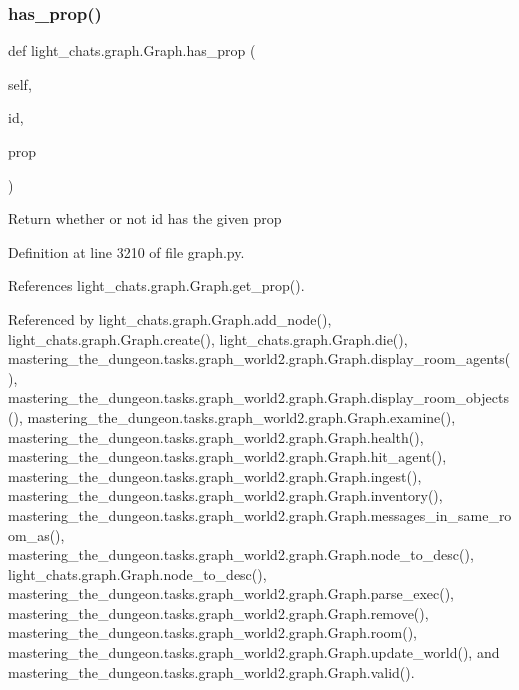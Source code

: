 \subsubsection{\texorpdfstring{has\+\_\+prop()}{has\_prop()}}
{\footnotesize\ttfamily def light\+\_\+chats.\+graph.\+Graph.\+has\+\_\+prop (\begin{DoxyParamCaption}\item[{}]{self,  }\item[{}]{id,  }\item[{}]{prop }\end{DoxyParamCaption})}

\begin{DoxyVerb}Return whether or not id has the given prop\end{DoxyVerb}
 

Definition at line 3210 of file graph.\+py.



References light\+\_\+chats.\+graph.\+Graph.\+get\+\_\+prop().



Referenced by light\+\_\+chats.\+graph.\+Graph.\+add\+\_\+node(), light\+\_\+chats.\+graph.\+Graph.\+create(), light\+\_\+chats.\+graph.\+Graph.\+die(), mastering\+\_\+the\+\_\+dungeon.\+tasks.\+graph\+\_\+world2.\+graph.\+Graph.\+display\+\_\+room\+\_\+agents(), mastering\+\_\+the\+\_\+dungeon.\+tasks.\+graph\+\_\+world2.\+graph.\+Graph.\+display\+\_\+room\+\_\+objects(), mastering\+\_\+the\+\_\+dungeon.\+tasks.\+graph\+\_\+world2.\+graph.\+Graph.\+examine(), mastering\+\_\+the\+\_\+dungeon.\+tasks.\+graph\+\_\+world2.\+graph.\+Graph.\+health(), mastering\+\_\+the\+\_\+dungeon.\+tasks.\+graph\+\_\+world2.\+graph.\+Graph.\+hit\+\_\+agent(), mastering\+\_\+the\+\_\+dungeon.\+tasks.\+graph\+\_\+world2.\+graph.\+Graph.\+ingest(), mastering\+\_\+the\+\_\+dungeon.\+tasks.\+graph\+\_\+world2.\+graph.\+Graph.\+inventory(), mastering\+\_\+the\+\_\+dungeon.\+tasks.\+graph\+\_\+world2.\+graph.\+Graph.\+messages\+\_\+in\+\_\+same\+\_\+room\+\_\+as(), mastering\+\_\+the\+\_\+dungeon.\+tasks.\+graph\+\_\+world2.\+graph.\+Graph.\+node\+\_\+to\+\_\+desc(), light\+\_\+chats.\+graph.\+Graph.\+node\+\_\+to\+\_\+desc(), mastering\+\_\+the\+\_\+dungeon.\+tasks.\+graph\+\_\+world2.\+graph.\+Graph.\+parse\+\_\+exec(), mastering\+\_\+the\+\_\+dungeon.\+tasks.\+graph\+\_\+world2.\+graph.\+Graph.\+remove(), mastering\+\_\+the\+\_\+dungeon.\+tasks.\+graph\+\_\+world2.\+graph.\+Graph.\+room(), mastering\+\_\+the\+\_\+dungeon.\+tasks.\+graph\+\_\+world2.\+graph.\+Graph.\+update\+\_\+world(), and mastering\+\_\+the\+\_\+dungeon.\+tasks.\+graph\+\_\+world2.\+graph.\+Graph.\+valid().

